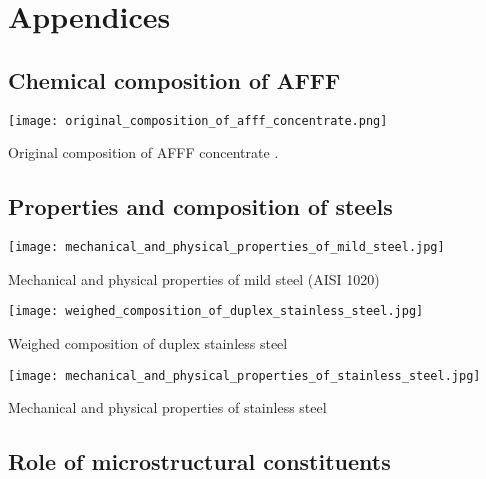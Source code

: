 \titleformat{\section}{\normalfont\large\bfseries}{\chaptertitlename\ \thechapter:}{0.5em}{}

\newcommand{\appendixsection}[1] {
    \addtocounter{chapter}{1}
    \section{#1}
}

\chapter*{Appendices}

\setcounter{chapter}{0}

\appendixsection{Chemical composition of AFFF}
\begin{table}[H]
    \texttt{[image: original\_composition\_of\_afff\_concentrate.png]}
    \caption{Original composition of AFFF concentrate \cite{hinnant2020characterizing}.}
\end{table}

\appendixsection{Properties and composition of steels}
\begin{table}[H]
    \texttt{[image: mechanical\_and\_physical\_properties\_of\_mild\_steel.jpg]}
    \caption{Mechanical and physical properties of mild steel (AISI 1020) \cite{kabir2020critical}}
\end{table}

\begin{table}[H]
    \texttt{[image: weighed\_composition\_of\_duplex\_stainless\_steel.jpg]}
    \caption{Weighed composition of duplex stainless steel \cite{sourmail2005stainless}}
\end{table}

\begin{table}[H]
    \texttt{[image: mechanical\_and\_physical\_properties\_of\_stainless\_steel.jpg]}
    \caption{Mechanical and physical properties of stainless steel \cite{bhadeshia2017steels}}
\end{table}

\appendixsection{Role of microstructural constituents}

